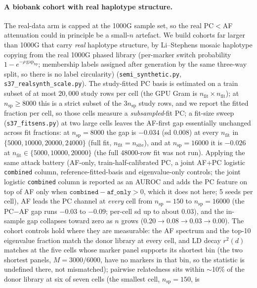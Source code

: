 \documentclass[11pt]{article}
\begin{document}
\paragraph{A biobank cohort with real haplotype structure.} The real-data arm is
capped at the 1000G sample set, so the real PC$<$AF attenuation could in
principle be a small-$n$ artefact. We build cohorts far larger than 1000G that
carry \emph{real} haplotype structure, by Li--Stephens mosaic haplotype copying
from the real 1000G phased library (per-marker switch probability
$1-e^{-\rho\,\text{gap}_{\text{bp}}}$; membership labels assigned after
generation by the same three-way split, so there is no label circularity)
(\texttt{semi\_synthetic.py}, \texttt{s37\_realsynth\_scale.py}). The
study-fitted PC basis is estimated on a train subset of at most $20{,}000$ study
rows per cell (the GPU Gram is $n_{\text{fit}}\times n_{\text{fit}}$); at
$n_{\text{sp}}{\ge}8000$ this is a strict subset of the $3n_{\text{sp}}$ study
rows, and we report the fitted fraction per cell, so those cells measure a
\emph{subsampled}-fit PC; a fit-size sweep
(\texttt{s37\_fitsens.py}) at two large cells leaves the AF-first gap
essentially unchanged across fit fractions: at $n_{\text{sp}}{=}8000$ the gap is
$-0.034$ (sd $0.008$) at every $n_{\text{fit}}$ in $\{5000,10000,20000,24000\}$
(full fit, $n_{\text{fit}}{=}n_{\text{site}}$), and at $n_{\text{sp}}{=}16000$ it
is $-0.026$ at
$n_{\text{fit}}\in\{5000,10000,20000\}$ (the full 48000-row fit was not run).
Applying the
same attack battery (AF-only, train-half-calibrated PC, a joint AF$+$PC logistic
\texttt{combined} column, reference-fitted-basis
and eigenvalue-only controls; the joint logistic \texttt{combined} column is
reported as an AUROC and adds the PC feature on top of AF only when
$\texttt{combined}-\texttt{af\_only}>0$, which it does not here; 5 seeds per cell), AF leads the PC channel at
\emph{every} cell from
$n_{\text{sp}}{=}150$ to $n_{\text{sp}}{=}16000$ (the PC$-$AF gap runs
$-0.03$ to $-0.09$; per-cell sd up to about $0.03$), and the in-sample gap collapses toward
zero as $n$ grows
($0.20{\to}0.08{\to}0.03{\to}0.00$). The cohort controls hold where they are
measurable: the AF spectrum and the top-10 eigenvalue fraction match the donor
library at every cell, and LD decay $r^2(d)$ matches at the five cells whose
marker panel supports its shortest bin (the two shortest panels, $M{=}3000/6000$,
have no markers in that bin, so the statistic is undefined there, not
mismatched); pairwise relatedness sits within $\sim$10\% of the donor
library at six of seven cells (the smallest cell, $n_{\text{sp}}{=}150$, is
\end{document}

